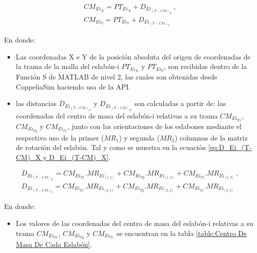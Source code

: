 \documentclass{article}
\begin{document}
\begin{sloppypar}
\begin{subequations} \label{eq:CM_Ei_X y CM_Ei_Y}
	\begin{align}
        \label{eq:CM_Ei_X}   CM_{Ei_X}=PT_{Ei_X}+D_{Ei_{(T-CM)_X}} \,,\\
        \label{eq:CM_Ei_Y}   CM_{Ei_Y}=PT_{Ei_Y}+D_{Ei_{(T-CM)_Y}} \,
	\end{align}
\end{subequations}

En donde:
\begin{itemize}
    \item Las coordenadas X e Y de la posición absoluta del origen de coordenadas de la trama de la malla del eslabón-i $PT_{Ei_X}$ y $PT_{Ei_Y}$, son recibidas dentro de la Función S de MATLAB de nivel 2, las cuales son obtenidas desde CoppeliaSim haciendo usa de la API.
    \item las distancias $D_{Ei_{(T-CM)_X}}$ y $D_{Ei_{(T-CM)_X}}$ son calculadas a partir de: las coordenadas del centro de masa del eslabón-i relativas a su trama $CM_{Ei_{Tx}}$, $CM_{Ei_{Ty}}$ y $CM_{Ei_{Tz}}$, junto con las orientaciones de los eslabones mediante el respectivo uso de la primer ($MR_1$) y segunda ($MR_2$) columnas de la matriz de rotación del eslabón. Tal y como se muestra en la ecuación \ref{eq:D_Ei_(T-CM)_X y D_Ei_(T-CM)_X}.
\end{itemize}

\begin{subequations} \label{eq:D_Ei_(T-CM)_X y D_Ei_(T-CM)_X}
	\begin{align}
        D_{Ei_{(T-CM)_X}} = CM_{Ei_{Tx}}.MR_{Ei_{[1,1]}} + CM_{Ei_{Ty}}.MR_{Ei_{[1,2]}} + CM_{Ei_{Tz}}.MR_{Ei_{[1,3]}} \,,
        \\
        D_{Ei_{(T-CM)_Y}} = CM_{Ei_{Tx}}.MR_{Ei_{[2,1]}} + CM_{Ei_{Ty}}.MR_{Ei_{[2,2]}} + CM_{Ei_{Tz}}.MR_{Ei_{[2,3]}} \,
    \end{align}
\end{subequations}

En donde:
\begin{itemize}
    \item Los valores de las coordenadas del centro de masa del eslabón-i relativas a su trama $CM_{Ei_{Tx}}$, $CM_{Ei_{Ty}}$ y $CM_{Ei_{Tz}}$ se encuentran en la tabla \ref{table:Centro De Masa De Cada Eslabón}.
\end{itemize}


\end{sloppypar}
\end{document}
